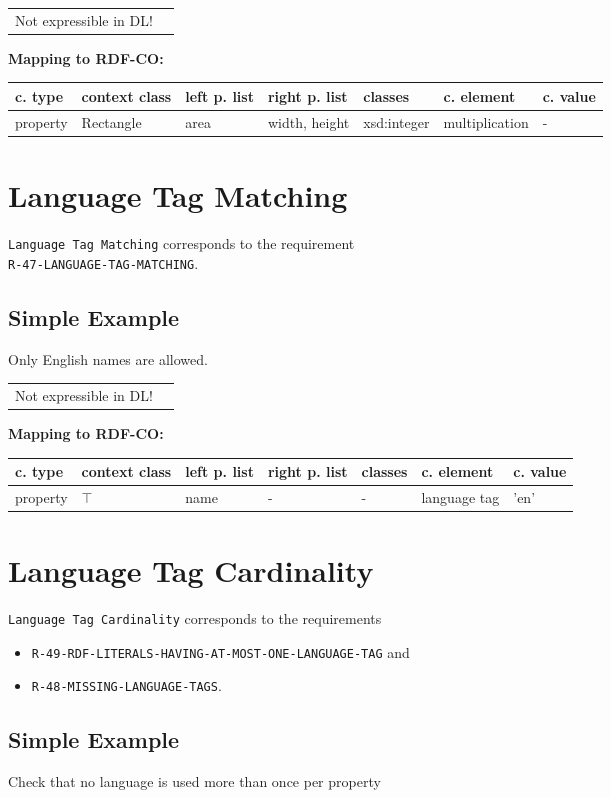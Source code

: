 \documentclass{llncs}
\newcommand{\ms}[1]{\texttt{#1}}
\newenvironment{gcotable}{
  \scriptsize
  \sffamily
  \vspace{0cm}
	\begin{center}
	\textbf{\vspace{0.4cm}Mapping to RDF-CO:} \\
  \begin{tabular}{l|l|l|l|l|l|l}
	\hline
  \textbf{c. type} & \textbf{context class} & \textbf{left p. list} & \textbf{right p. list} & \textbf{classes} & \textbf{c. element} & \textbf{c. value} \\
  \hline

}{
  \hline
  \end{tabular}
	\end{center}
}
\newenvironment{DL}{
  \vspace{0cm}
	\begin{center}
  \begin{tabular}{r l}

}{
  \end{tabular}
	\end{center}
}
\begin{document}
\begin{DL}
Not expressible in DL!
\end{DL}

\begin{gcotable}
property & Rectangle & area & width, height & xsd:integer & multiplication & - \\
\end{gcotable}

\section{Language Tag Matching}

\ms{Language Tag Matching} corresponds to the requirement \\
\ms{R-47-LANGUAGE-TAG-MATCHING}.

\subsection{Simple Example}

Only English names are allowed.

\begin{DL}
Not expressible in DL!
\end{DL}

\begin{gcotable}
property & $\top$ & name & - & - & language tag & 'en' \\
\end{gcotable}

\section{Language Tag Cardinality}

\ms{Language Tag Cardinality} corresponds to the requirements
\begin{itemize}
	\item \ms{R-49-RDF-LITERALS-HAVING-AT-MOST-ONE-LANGUAGE-TAG} and
	\item \ms{R-48-MISSING-LANGUAGE-TAGS}.
\end{itemize}

\subsection{Simple Example}

Check that no language is used more than once per property

\end{document}
